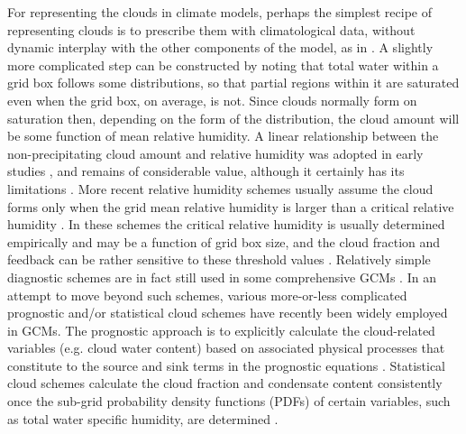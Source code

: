 For representing the clouds in climate models, perhaps the simplest recipe of representing clouds is to prescribe them with climatological data, without dynamic interplay with the other components of the model, as in \citet{Holloway1971}. A slightly more complicated step can be constructed by noting that total water within a grid box follows some distributions, so that partial regions within it are saturated even when the grid box, on average, is not. Since clouds normally form on saturation then, depending on the form of the distribution, the cloud amount will be some function of mean relative humidity. A linear relationship between the non-precipitating cloud amount and relative humidity was adopted in early studies \citep[e.g.,][]{Smagorinsky1960, Ricketts1973}, and remains of considerable value, although it certainly has its limitations \citep[e.g.,][]{Ming2018}. More recent relative humidity schemes usually assume the cloud forms only when the grid mean relative humidity is larger than a critical relative humidity \citep[e.g.,][]{Sundqvist1989, Slingo1980, Slingo1987}. In these schemes the critical relative humidity is usually determined empirically and may be a function of grid box size, and the cloud fraction and feedback can be rather sensitive to these threshold values \citep{Quaas2012}. Relatively simple diagnostic schemes are in fact still used in some comprehensive GCMs \citep[e.g.,][]{Giorgetta2018}. In an attempt to move beyond such schemes, various more-or-less complicated prognostic and/or statistical cloud schemes have recently been widely employed in GCMs. The prognostic approach is to explicitly calculate the cloud-related variables (e.g. cloud water content) based on associated physical processes that constitute to the source and sink terms in the prognostic equations \citep[e.g.,][]{Tiedtke1993}. Statistical cloud schemes calculate the cloud fraction and condensate content consistently once the sub-grid probability density functions (PDFs) of certain variables, such as total water specific humidity, are determined \citep[e.g.,][]{Sommeria1977,Smith1990,Tompkins2002, Park2014,Qin2018,Tsang2018}. 

